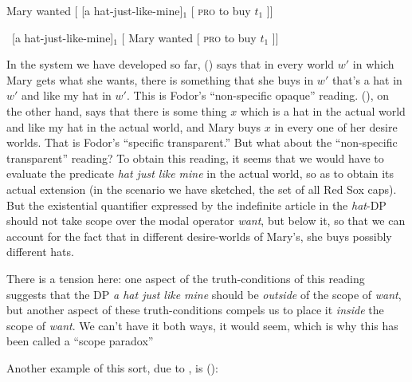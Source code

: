 \ex Mary wanted [ [a hat-just-like-mine]$_{1}$ [ \textsc{pro} to buy $t_{1}$ ]] \xe

\ex\ [a hat-just-like-mine]$_{1}$ [ Mary wanted [ \textsc{pro} to buy $t_{1}$ ]] \xe

In the system we have developed so far, (\blastx) says that in every world $w'$ in which Mary gets what she wants, there is something that she buys in $w'$ that's a hat in $w'$ and like my hat in $w'$. This is Fodor's ``non-specific opaque'' reading. (\lastx), on the other hand, says that there is some thing $x$ which is a hat in the actual world and like my hat in the actual world, and Mary buys $x$ in every one of her desire worlds. That is Fodor's ``specific transparent.'' But what about the ``non-specific transparent'' reading? To obtain this reading, it seems that we would have to evaluate the predicate \emph{hat just like mine} in the actual world, so as to obtain its actual extension (in the scenario we have sketched, the set of all Red Sox caps). But the existential quantifier expressed by the indefinite article in the \emph{hat}-DP should not take scope over the modal operator \emph{want}, but below it, so that we can account for the fact that in different desire-worlds of Mary's, she buys possibly different hats.

There is a tension here: one aspect of the truth-conditions of this reading suggests that the DP \emph{a hat just like mine} should be \emph{outside} of the scope of \emph{want}, but another aspect of these truth-conditions compels us to place it \emph{inside} the scope of \emph{want}. We can't have it both ways, it would seem, which is why this has been called a ``scope paradox''

Another example of this sort, due to \citet{bauerle:1983:nps}, is (\nextx):

